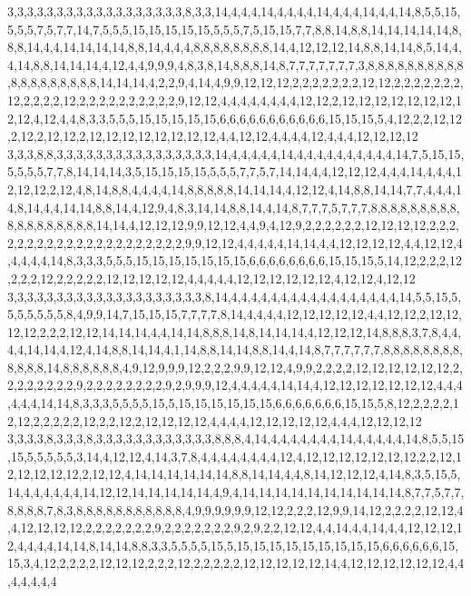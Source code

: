 3,3,3,3,3,3,3,3,3,3,3,3,3,3,3,3,3,3,8,3,3,14,4,4,4,14,4,4,4,4,14,4,4,4,14,4,4,14,8,5,5,15,5,5,5,7,5,7,7,14,7,5,5,5,15,15,15,15,15,5,5,5,7,5,15,15,7,7,8,8,14,8,8,14,14,14,14,14,8,8,8,14,4,4,14,14,14,14,8,8,14,4,4,4,8,8,8,8,8,8,8,8,14,4,12,12,12,14,8,8,14,14,8,5,14,4,4,14,8,8,14,14,14,4,12,4,4,9,9,9,4,8,3,8,14,8,8,8,14,8,7,7,7,7,7,7,7,3,8,8,8,8,8,8,8,8,8,8,8,8,8,8,8,8,8,8,8,14,14,14,4,2,2,9,4,14,4,9,9,12,12,12,2,2,2,2,2,2,2,12,12,2,2,2,2,2,2,2,12,2,2,2,2,12,2,2,2,2,2,2,2,2,2,2,9,12,12,4,4,4,4,4,4,4,4,12,12,2,12,12,12,12,12,12,12,12,12,4,12,4,4,8,3,3,5,5,5,15,15,15,15,15,6,6,6,6,6,6,6,6,6,6,6,15,15,15,5,4,12,2,2,12,12,2,12,2,12,12,2,12,12,12,12,12,12,12,12,4,4,12,12,4,4,4,4,12,4,4,4,12,12,12,12
3,3,3,8,8,3,3,3,3,3,3,3,3,3,3,3,3,3,3,3,3,14,4,4,4,4,4,14,4,4,4,4,4,4,4,4,4,4,14,7,5,15,15,5,5,5,5,7,7,8,14,14,14,3,5,15,15,15,15,5,5,5,7,7,5,7,14,14,4,4,12,12,12,4,4,4,14,4,4,4,12,12,12,2,12,4,8,14,8,8,4,4,4,4,14,8,8,8,8,8,14,14,14,4,12,12,4,14,8,8,14,14,7,7,4,4,4,14,8,14,4,4,14,14,8,8,14,4,12,9,4,8,3,14,14,8,8,14,4,14,8,7,7,7,5,7,7,7,8,8,8,8,8,8,8,8,8,8,8,8,8,8,8,8,8,8,14,14,4,12,12,12,9,9,12,12,4,4,9,4,12,9,2,2,2,2,2,2,12,12,12,12,2,2,2,2,2,2,2,2,2,2,2,2,2,2,2,2,2,2,2,2,2,9,9,12,12,4,4,4,4,4,14,14,4,4,12,12,12,12,4,4,12,12,4,4,4,4,4,14,8,3,3,3,5,5,5,15,15,15,15,15,15,15,6,6,6,6,6,6,6,6,15,15,15,5,14,12,2,2,2,12,2,2,2,12,2,2,2,2,2,12,12,12,12,12,4,4,4,4,4,12,12,12,12,12,12,4,12,12,4,12,12
3,3,3,3,3,3,3,3,3,3,3,3,3,3,3,3,3,3,3,3,8,14,4,4,4,4,4,4,4,4,4,4,4,4,4,4,4,4,4,14,5,5,15,5,5,5,5,5,5,5,8,4,9,9,14,7,15,15,15,7,7,7,7,8,14,4,4,4,4,12,12,12,12,12,4,4,12,12,2,12,12,12,12,2,2,2,12,12,14,14,14,4,4,14,14,8,8,8,14,8,14,14,14,4,12,12,12,14,8,8,8,3,7,8,4,4,4,4,14,14,4,12,4,14,8,8,14,14,4,1,14,8,8,14,14,8,8,14,4,14,8,7,7,7,7,7,7,8,8,8,8,8,8,8,8,8,8,8,8,14,8,8,8,8,8,8,4,9,12,9,9,9,12,2,2,2,9,9,12,12,4,9,9,2,2,2,2,12,12,12,12,12,12,2,2,2,2,2,2,2,2,9,2,2,2,2,2,2,2,2,9,2,9,9,9,12,4,4,4,4,4,14,14,4,12,12,12,12,12,12,12,4,4,4,4,4,4,14,14,8,3,3,3,5,5,5,5,15,5,15,15,15,15,15,15,6,6,6,6,6,6,6,15,15,5,8,12,2,2,2,2,12,12,2,2,2,2,2,12,2,2,12,2,12,12,12,12,4,4,4,4,12,12,12,12,12,4,4,4,12,12,12,12
3,3,3,3,8,3,3,3,8,3,3,3,3,3,3,3,3,3,3,3,3,8,8,8,4,14,4,4,4,4,4,4,4,14,4,4,4,4,4,14,8,5,5,15,15,5,5,5,5,5,3,14,4,12,12,4,14,3,7,8,4,4,4,4,4,4,4,4,12,4,12,12,12,12,12,12,12,2,2,12,12,12,12,12,12,2,12,12,4,14,14,14,14,14,14,8,8,14,14,4,4,8,14,12,12,12,4,14,8,3,5,15,5,14,4,4,4,4,4,4,14,12,12,14,14,14,14,14,4,9,4,14,14,14,14,14,14,14,14,14,14,8,7,7,5,7,7,8,8,8,8,7,8,3,8,8,8,8,8,8,8,8,8,8,8,4,9,9,9,9,9,9,12,12,2,2,2,12,9,9,14,12,2,2,2,2,12,12,4,4,12,12,12,12,2,2,2,2,2,2,2,9,2,2,2,2,2,2,2,9,2,9,2,2,12,12,4,4,14,4,4,14,4,4,12,12,12,12,4,4,4,4,14,14,8,14,14,8,8,3,3,5,5,5,5,15,5,15,15,15,15,15,15,15,15,15,6,6,6,6,6,6,15,15,3,4,12,2,2,2,2,12,12,12,2,2,2,12,2,2,2,2,2,12,12,12,12,12,14,4,12,12,12,12,12,12,4,4,4,4,4,4,4
